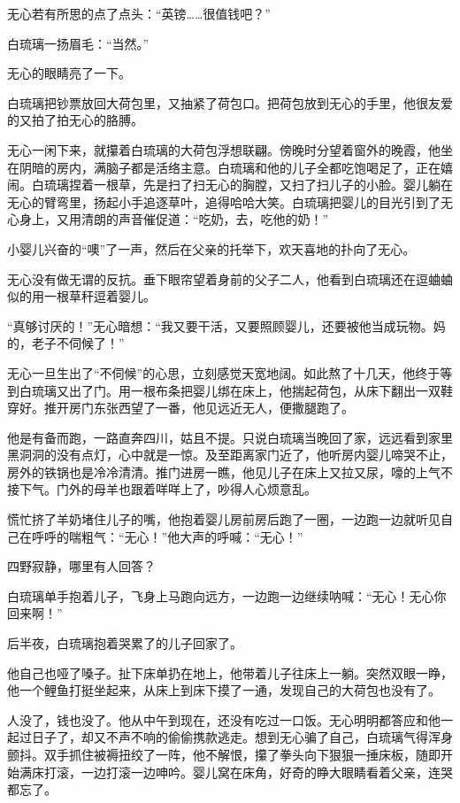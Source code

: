 无心若有所思的点了点头：``英镑\ldots{}\ldots{}很值钱吧？''

白琉璃一扬眉毛：``当然。''

无心的眼睛亮了一下。

白琉璃把钞票放回大荷包里，又抽紧了荷包口。把荷包放到无心的手里，他很友爱的又拍了拍无心的胳膊。

无心一闲下来，就攥着白琉璃的大荷包浮想联翩。傍晚时分望着窗外的晚霞，他坐在阴暗的房内，满脑子都是活络主意。白琉璃和他的儿子全都吃饱喝足了，正在嬉闹。白琉璃捏着一根草，先是扫了扫无心的胸膛，又扫了扫儿子的小脸。婴儿躺在无心的臂弯里，扬起小手追逐草叶，追得哈哈大笑。白琉璃把婴儿的目光引到了无心身上，又用清朗的声音催促道：``吃奶，去，吃他的奶！''

小婴儿兴奋的``噢''了一声，然后在父亲的托举下，欢天喜地的扑向了无心。

无心没有做无谓的反抗。垂下眼帘望着身前的父子二人，他看到白琉璃还在逗蛐蛐似的用一根草秆逗着婴儿。

``真够讨厌的！''无心暗想：``我又要干活，又要照顾婴儿，还要被他当成玩物。妈的，老子不伺候了！''

无心一旦生出了``不伺候''的心思，立刻感觉天宽地阔。如此熬了十几天，他终于等到白琉璃又出了门。用一根布条把婴儿绑在床上，他揣起荷包，从床下翻出一双鞋穿好。推开房门东张西望了一番，他见远近无人，便撒腿跑了。

他是有备而跑，一路直奔四川，姑且不提。只说白琉璃当晚回了家，远远看到家里黑洞洞的没有点灯，心中就是一惊。及至距离家门近了，他听房内婴儿啼哭不止，房外的铁锅也是冷冷清清。推门进房一瞧，他见儿子在床上又拉又尿，嚎的上气不接下气。门外的母羊也跟着咩咩上了，吵得人心烦意乱。

慌忙挤了羊奶堵住儿子的嘴，他抱着婴儿房前房后跑了一圈，一边跑一边就听见自己在呼呼的喘粗气：``无心！''他大声的呼喊：``无心！''

四野寂静，哪里有人回答？

白琉璃单手抱着儿子，飞身上马跑向远方，一边跑一边继续呐喊：``无心！无心你回来啊！''

后半夜，白琉璃抱着哭累了的儿子回家了。

他自己也哑了嗓子。扯下床单扔在地上，他带着儿子往床上一躺。突然双眼一睁，他一个鲤鱼打挺坐起来，从床上到床下摸了一通，发现自己的大荷包也没有了。

人没了，钱也没了。他从中午到现在，还没有吃过一口饭。无心明明都答应和他一起过日子了，却又不声不响的偷偷携款逃走。想到无心骗了自己，白琉璃气得浑身颤抖。双手抓住被褥扭绞了一阵，他不解恨，攥了拳头向下狠狠一捶床板，随即开始满床打滚，一边打滚一边呻吟。婴儿窝在床角，好奇的睁大眼睛看着父亲，连哭都忘了。

